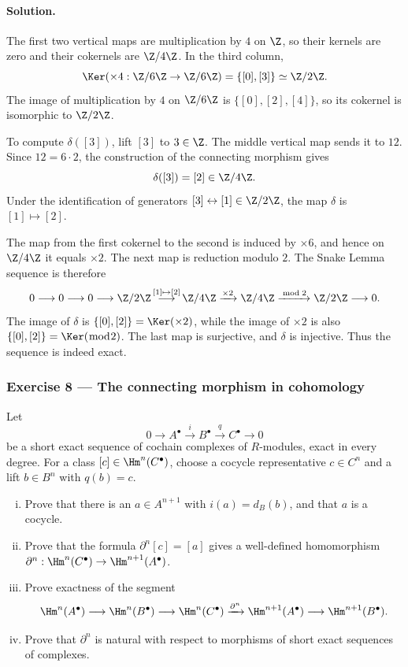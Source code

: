 \paragraph{Solution.}
\hypertarget{o014.mastery.diagram-chasing.001.sol07}{ }
The first two vertical maps are multiplication by $4$ on $\Z$, so their
kernels are zero and their cokernels are $\Z/4\Z$. In the third column,
\[
	\Ker(\times4:\Z/6\Z\to\Z/6\Z)=\{[0],[3]\}\simeq\Z/2\Z.
\]
The image of multiplication by $4$ on $\Z/6\Z$ is
$\{[0],[2],[4]\}$, so its cokernel is isomorphic to $\Z/2\Z$.

To compute $\delta([3])$, lift $[3]$ to $3\in\Z$. The middle vertical map
sends it to $12$. Since $12=6\cdot2$, the construction of the connecting
morphism gives
\[
	\delta([3])=[2]\in\Z/4\Z.
\]
Under the identification of generators
$[3]\leftrightarrow[1]\in\Z/2\Z$, the map $\delta$ is
$[1]\mapsto[2]$.

The map from the first cokernel to the second is induced by $\times6$, and
hence on $\Z/4\Z$ it equals $\times2$. The next map is reduction modulo $2$.
The Snake Lemma sequence is therefore
\[
	0\longrightarrow0\longrightarrow0\longrightarrow\Z/2\Z
	\mathop{\longrightarrow}^{[1]\mapsto[2]}\Z/4\Z
	\xrightarrow{\times2}\Z/4\Z
	\xrightarrow{\bmod 2}\Z/2\Z\longrightarrow0.
\]
The image of $\delta$ is $\{[0],[2]\}=\Ker(\times2)$, while the image of
$\times2$ is also $\{[0],[2]\}=\Ker(\bmod 2)$. The last map is
surjective, and $\delta$ is injective. Thus the sequence is indeed exact.

\subsubsection*{Exercise 8 --- The connecting morphism in cohomology}
\hypertarget{o014.mastery.diagram-chasing.001.ex08}{ }
\label{mastery:diagram-chasing-001-ex08}

Let
\[
	0\longrightarrow A^\bullet\xrightarrow{i}B^\bullet
	\xrightarrow{q}C^\bullet\longrightarrow0
\]
be a short exact sequence of cochain complexes of $R$-modules, exact in
every degree. For a class $[c]\in\Hm^n(C^\bullet)$, choose a cocycle
representative $c\in C^n$ and a lift $b\in B^n$ with $q(b)=c$.
\begin{enumerate}[(i)]
	\item Prove that there is an $a\in A^{n+1}$ with
	$i(a)=d_B(b)$, and that $a$ is a cocycle.
	\item Prove that the formula $\partial^n[c]=[a]$ gives a well-defined
	homomorphism
	$\partial^n:\Hm^n(C^\bullet)\to\Hm^{n+1}(A^\bullet)$.
	\item Prove exactness of the segment
	\[
		\Hm^n(A^\bullet)\longrightarrow\Hm^n(B^\bullet)
		\longrightarrow\Hm^n(C^\bullet)\xrightarrow{\partial^n}
		\Hm^{n+1}(A^\bullet)\longrightarrow\Hm^{n+1}(B^\bullet).
	\]
	\item Prove that $\partial^n$ is natural with respect to morphisms of
	short exact sequences of complexes.
\end{enumerate}

